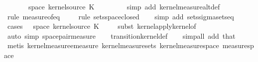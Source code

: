 \begin{isabellebody}
\ \ \ \ \ {\isachardoublequoteopen}{\isasymomega}\ {\isasymin}\ space\ {\isacharparenleft}{\kern0pt}kernel{\isacharunderscore}{\kern0pt}source\ K{\isacharunderscore}{\kern0pt}{}{\isacharparenright}{\kern0pt}{\isachardoublequoteclose}\ \ {\isasymomega}\ {\isasymomega}\isanewline
\ \ \ \ \isamarkupfalse%
\ {\isacharparenleft}{\kern0pt}simp\ add{\isacharcolon}{\kern0pt}\ kernel{\isacharunderscore}{\kern0pt}measure{\isacharunderscore}{\kern0pt}altdef{\isacharparenright}{\kern0pt}\isanewline
\ \ \isamarkupfalse%
\ {\isacharparenleft}{\kern0pt}rule\ measure{\isacharunderscore}{\kern0pt}of{\isacharunderscore}{\kern0pt}eq{\isacharparenright}{\kern0pt}\isanewline
\ \ \ \isamarkupfalse%
\ {\isacharparenleft}{\kern0pt}rule\ sets{\isachardot}{\kern0pt}space{\isacharunderscore}{\kern0pt}closed{\isacharparenright}{\kern0pt}\isanewline
\ \ \isamarkupfalse%
\ {\isacharparenleft}{\kern0pt}simp\ add{\isacharcolon}{\kern0pt}\ sets{\isachardot}{\kern0pt}sigma{\isacharunderscore}{\kern0pt}sets{\isacharunderscore}{\kern0pt}eq{\isacharparenright}{\kern0pt}\isanewline
\ \ \isamarkupfalse%
\ {\isacharparenleft}{\kern0pt}cases\ {\isachardoublequoteopen}{\isasymomega}\ {\isasymin}\ space\ {\isacharparenleft}{\kern0pt}kernel{\isacharunderscore}{\kern0pt}source\ K{\isacharunderscore}{\kern0pt}{}{\isacharparenright}{\kern0pt}{\isachardoublequoteclose}{\isacharparenright}{\kern0pt}\isanewline
\ \ \ \isamarkupfalse%
\ {\isacharparenleft}{\kern0pt}subst\ kernel{\isacharunderscore}{\kern0pt}apply{\isacharunderscore}{\kern0pt}kernel{\isacharunderscore}{\kern0pt}of{\isacharparenright}{\kern0pt}\isanewline
\ \ \ \ \ \ \isamarkupfalse%
\ {\isacharparenleft}{\kern0pt}auto\ simp{\isacharcolon}{\kern0pt}\ space{\isacharunderscore}{\kern0pt}pair{\isacharunderscore}{\kern0pt}measure{\isacharparenright}{\kern0pt}\isanewline
\ \ \isamarkupfalse%
\ transition{\isacharunderscore}{\kern0pt}kernel{\isacharunderscore}{\kern0pt}def\isanewline
\ \ \isamarkupfalse%
\ {\isacharparenleft}{\kern0pt}simp{\isacharunderscore}{\kern0pt}all\ add{\isacharcolon}{\kern0pt}\ that{\isacharparenright}{\kern0pt}\isanewline
\ \ \isamarkupfalse%
\ {\isacharparenleft}{\kern0pt}metis\ kernel{\isacharunderscore}{\kern0pt}measure{\isacharunderscore}{\kern0pt}emeasure\ kernel{\isacharunderscore}{\kern0pt}measure{\isacharunderscore}{\kern0pt}sets\ kernel{\isacharunderscore}{\kern0pt}measure{\isacharunderscore}{\kern0pt}space\ measure{\isacharunderscore}{\kern0pt}space{\isacharparenright}{\kern0pt}\isanewline

\end{isabellebody}
